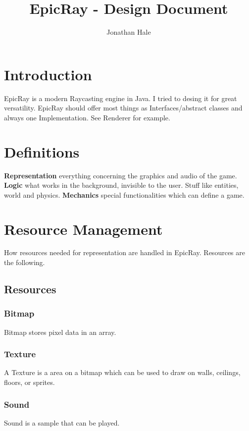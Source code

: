 \documentclass[11pt,a4paper,notitlepage]{article}
\title{EpicRay - Design Document}
\author{Jonathan Hale}
\begin{document}
\maketitle

\section{Introduction}
EpicRay is a modern Raycasting engine in Java. I tried to desing it for great versatility. 
EpicRay should offer most things as Interfaces/abstract classes and always one Implementation. See Renderer for example.

\section{Definitions}
\textbf{Representation} everything concerning the graphics and audio of the game.  \newline
\textbf{Logic} what works in the background, invisible to the user. Stuff like entities, world and physics. \newline
\textbf{Mechanics} special functionalities which can define a game.


\section{Resource Management}
How resources needed for representation are handled in EpicRay. Resources are the following.

\subsection{Resources}

\subsubsection{Bitmap}
Bitmap stores pixel data in an array. 

\subsubsection{Texture}
A Texture is a area on a bitmap which can be used to draw on walls, ceilings, floors, or sprites.

\subsubsection{Sound}
Sound is a sample that can be played.
\end{document}
